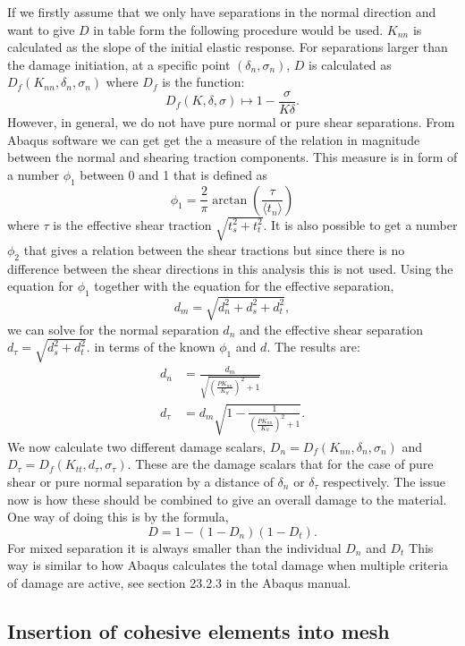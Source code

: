 \documentclass[grain_boundary_law.tex]{subfiles}
\begin{document}
If we firstly assume that we only have separations in the normal direction and want to give $D$ in table form the following procedure would be used. $K_{nn}$ is calculated as the slope of the initial elastic response. For separations larger than the damage initiation, at a specific point $(\delta_n, \sigma_n)$, $D$ is calculated as $D_f(K_{nn}, \delta_n, \sigma_n)$ where $D_f$ is the function:
%
\[ D_f(K, \delta, \sigma) \mapsto   1 - \frac{\sigma}{K\delta}. \]
%
However, in general, we do not have pure normal or pure shear separations. From Abaqus software we can get get the a measure of the relation in magnitude between the normal and shearing traction components. This measure is in form of a number $\phi_1$ between 0 and 1 that is defined as
%
\[ \phi_1 = \frac{2}{\pi} \arctan \left( \frac{ \tau}{\langle t_n \rangle} \right) \]
%
where $\tau$ is the effective shear traction $\sqrt{t_s^2 + t_t^2}$. It is also possible to get a number $\phi_2$ that gives a relation between the shear tractions but since there is no difference between the shear directions in this analysis this is not used. Using the equation for $\phi_1$ together with the equation for the effective separation,
%
\[ d_m = \sqrt{d_n^2 + d_s^2 + d_t^2},  \]
%
we can solve for the normal separation $d_n$ and the effective shear separation $ d_\tau = \sqrt{d_s^2 + d_t^2}.$ in terms of the known $\phi_1$ and $d$. The results are:
%
\begin{align}
 d_n & = \frac{d_m}{\sqrt{\left(\frac{PK_{nn}}{K_{tt}}\right)^2 + 1 }  }  \\
 d_\tau  & = d_m\sqrt{1 -\frac{1}{\left(\frac{PK_{nn}}{K_{tt}} \right)^2 + 1 }}.
\end{align}
%
We now calculate two different damage scalars, $D_n = D_f(K_{nn}, \delta_n, \sigma_n)$ and $D_\tau = D_f(K_{tt}, d_\tau, \sigma_\tau)$. These are the damage scalars that for the case of pure shear or pure normal separation by a distance of $\delta_n$ or $\delta_\tau$ respectively. The issue now is how these should be combined to give an overall damage to the material. One way of doing this is by the formula,
%
\[ D = 1 - (1 - D_n)(1 - D_t). \]
%
For mixed separation it is always smaller than the individual $D_n$ and $D_t$ This way is similar to how Abaqus calculates the total damage when multiple criteria of damage are active, see section 23.2.3 in the Abaqus manual. 


\subsection{Insertion of cohesive elements into mesh}
\end{document}
